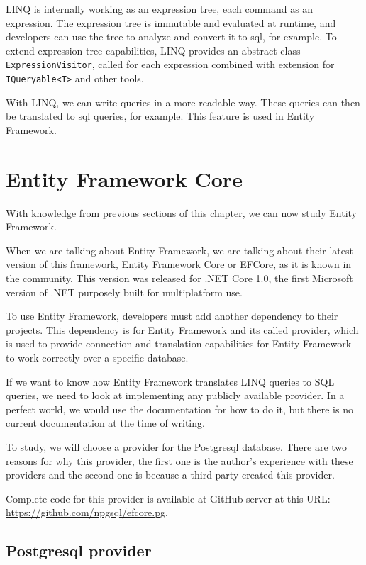 LINQ is internally working as an expression tree, each command as an expression. The expression tree is immutable and evaluated at runtime, and developers
can use the tree to analyze and convert it to \acrshort{sql}, for example. To extend expression tree capabilities, LINQ provides an abstract class \texttt{ExpressionVisitor},
called for each expression combined with extension for \texttt{IQueryable<T>} and other tools.


With LINQ, we can write queries in a more readable way. These queries can then be translated to \acrshort{sql} queries, for example.
This feature is used in Entity Framework.

\section {Entity Framework Core}

With knowledge from previous sections of this chapter, we can now study Entity Framework.

When we are talking about Entity Framework, we are talking about their latest version of this framework, Entity Framework Core or EFCore, as it is known in the community.
This version was released for .NET Core 1.0, the first Microsoft version of .NET purposely built for multiplatform use.

To use Entity Framework, developers must add another dependency to their projects. This dependency is for Entity Framework and its called provider, which is used
to provide connection and translation capabilities for Entity Framework to work correctly over a specific database.

If we want to know how Entity Framework translates LINQ queries to SQL queries, we need to look at implementing any publicly available provider.
In a perfect world, we would use the documentation for how to do it, but there is no current documentation at the time of writing.

To study, we will choose a provider for the Postgresql database. There are two reasons for why this provider, the first one is the author's experience with these providers and the second one
is because a third party created this provider.

Complete code for this provider is available at GitHub server at this URL: \url{https://github.com/npgsql/efcore.pg}.

\subsection {Postgresql provider}

